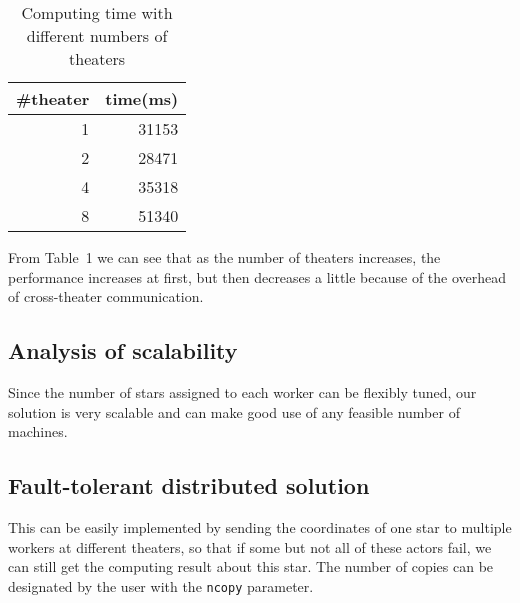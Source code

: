 \documentclass[12pt,letterpaper]{article}
\begin{document}
\begin{table}
\begin{center}
\caption{Computing time with different numbers of theaters}
\begin{tabular}{r|r}
\#theater & time(ms)\\
\hline
1 & 31153\\
2 & 28471\\
4 & 35318\\
8 & 51340\\
\end{tabular}
\end{center}
\end{table}
From Table~1 we can see that as the number of theaters increases, the performance increases at first, but then decreases a little because of the overhead of cross-theater communication.

\subsection*{Analysis of scalability}
Since the number of stars assigned to each worker can be flexibly tuned, our solution is very scalable and can make good use of any feasible number of machines.

\subsection*{Fault-tolerant distributed solution}
This can be easily implemented by sending the coordinates of one star to multiple workers at different theaters, so that if some but not all of these actors fail, we can still get the computing result about this star. The number of copies can be designated by the user with the \texttt{ncopy} parameter.
\end{document}
